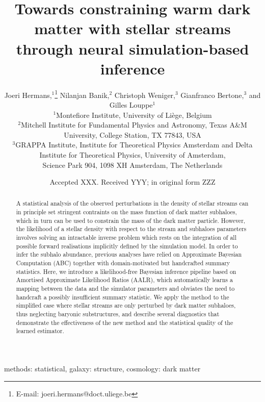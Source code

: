 \documentclass[fleqn,usenatbib]{mnras}
\title[Constraining WDM with simulation-based inference]{Towards constraining warm dark matter with stellar streams through neural simulation-based inference}
\author[J. Hermans et al.]{
Joeri Hermans,$^{1}$\thanks{E-mail: joeri.hermans@doct.uliege.be}
Nilanjan Banik,$^{2}$
Christoph Weniger,$^{3}$
Gianfranco Bertone,$^{3}$
and Gilles Louppe$^{1}$
\\
$^{1}$Montefiore Institute, University of Li{\`e}ge, Belgium\\
$^{2}$Mitchell Institute for Fundamental Physics and Astronomy, Texas A\&M University, College Station, TX 77843, USA\\
$^{3}$GRAPPA Institute, Institute for Theoretical Physics Amsterdam
and Delta Institute for Theoretical Physics, University of Amsterdam, \\
Science Park 904, 1098 XH Amsterdam, The Netherlands
}
\date{Accepted XXX. Received YYY; in original form ZZZ}
\begin{document}
\label{firstpage}
\pagerange{\pageref{firstpage}--\pageref{lastpage}}
\maketitle

\begin{abstract}
A statistical analysis of the observed perturbations in the density of stellar streams can in principle set stringent contraints on the mass function of dark matter subhaloes, which in turn can be used to constrain the mass of the dark matter particle. However, the likelihood of a stellar density with respect to the stream and subhaloes parameters involves solving an intractable inverse problem which rests on the integration of all possible forward realisations  implicitly defined by the simulation model. 
In order to infer the subhalo abundance, previous analyses have relied on Approximate Bayesian Computation (ABC) together with domain-motivated but handcrafted summary statistics. 
Here, we introduce a likelihood-free Bayesian inference pipeline based on Amortised Approximate Likelihood Ratios (AALR), which automatically learns a mapping between the data and the simulator parameters and obviates the need to handcraft a possibly insufficient summary statistic.
We apply the method to the simplified case where stellar streams are only perturbed by dark matter subhaloes, thus neglecting baryonic substructures, and describe several diagnostics that demonstrate the effectiveness of the new method and the statistical quality of the learned estimator.
\end{abstract}

\begin{keywords}
  methods: statistical, galaxy: structure, cosmology: dark matter
\end{keywords}


\end{document}
